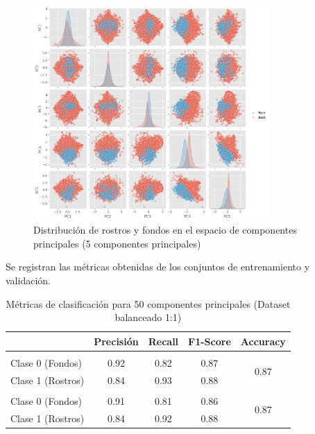 \documentclass{article}
\begin{document}
\begin{figure}[H]
    \centering
    \includegraphics[width=0.8\textwidth]{tarea_2/imagenes/pca_classes_x1_v1_50_5_components.png}
    \caption{Distribución de rostros y fondos en el espacio de componentes principales (5 componentes principales)}
    \label{fig:pca_classes}
\end{figure}

Se registran las métricas obtenidas de los conjuntos de entrenamiento y validación.

\begin{table}[H]
    \centering
    \begin{tabular}{|>{\centering\arraybackslash}m{3.2cm}|c|c|c|c|}
    \hline
    \rowcolor{tableblue} \multicolumn{1}{|c|}{\textbf{Conjunto}} & \textbf{Precisión} & \textbf{Recall} & \textbf{F1-Score} & \textbf{Accuracy} \\
    \hline
    \multicolumn{5}{|c|}{\textbf{Entrenamiento}} \\
    \hline
    Clase 0 (Fondos) & 0.92 & 0.82 & 0.87 & \multirow{2}{*}{0.87} \\
    Clase 1 (Rostros) & 0.84 & 0.93 & 0.88 & \\
    \hline
    \multicolumn{5}{|c|}{\textbf{Validación}} \\
    \hline
    Clase 0 (Fondos) & 0.91 & 0.81 & 0.86 & \multirow{2}{*}{0.87} \\
    Clase 1 (Rostros) & 0.84 & 0.92 & 0.88 & \\
    \hline
    \end{tabular}
    \caption{Métricas de clasificación para 50 componentes principales (Dataset balanceado 1:1)}
    \label{tab:pca_x1_metrics}
\end{table}
\end{document}
